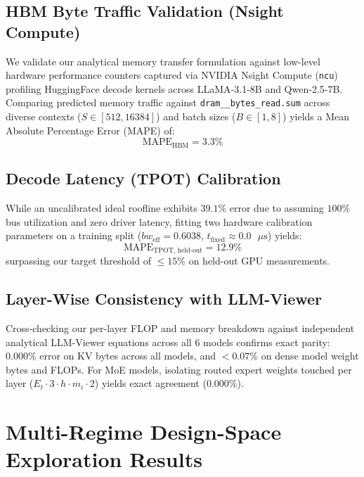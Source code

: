 \documentclass[conference,onecolumn]{IEEEtran}
\begin{document}
\subsection{HBM Byte Traffic Validation (Nsight Compute)}
We validate our analytical memory transfer formulation against low-level hardware performance counters captured via NVIDIA Nsight Compute (\texttt{ncu}) profiling HuggingFace decode kernels across LLaMA-3.1-8B and Qwen-2.5-7B. Comparing predicted memory traffic against \texttt{dram\_\_bytes\_read.sum} across diverse contexts ($S \in [512, 16384]$) and batch sizes ($B \in [1, 8]$) yields a Mean Absolute Percentage Error (MAPE) of:
\begin{equation}
\text{MAPE}_{\text{HBM}} = \mathbf{3.3\%}
\end{equation}

\subsection{Decode Latency (TPOT) Calibration}
While an uncalibrated ideal roofline exhibits $39.1\%$ error due to assuming $100\%$ bus utilization and zero driver latency, fitting two hardware calibration parameters on a training split ($bw_{\text{eff}} = 0.6038$, $t_{\text{fixed}} \approx 0.0\text{ }\mu\text{s}$) yields:
\begin{equation}
\text{MAPE}_{\text{TPOT, held-out}} = \mathbf{12.9\%}
\end{equation}
surpassing our target threshold of $\le 15\%$ on held-out GPU measurements.

\subsection{Layer-Wise Consistency with LLM-Viewer}
Cross-checking our per-layer FLOP and memory breakdown against independent analytical LLM-Viewer \cite{yuan2024llmviewer} equations across all 6 models confirms exact parity: $0.000\%$ error on KV bytes across all models, and $<0.07\%$ on dense model weight bytes and FLOPs. For MoE models, isolating routed expert weights touched per layer ($E_t \cdot 3 \cdot h \cdot m_i \cdot 2$) yields exact agreement ($0.000\%$).

\section{Multi-Regime Design-Space Exploration Results}
\end{document}
